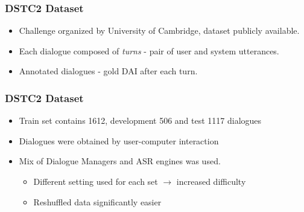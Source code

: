 \begin{frame}
\frametitle{DSTC2 Dataset\cite{Henderson2014a}}
\begin{itemize}
\item Challenge organized by University of Cambridge, dataset publicly available.
\item Each dialogue composed of \textit{turns} - pair of user and system utterances.
\item Annotated dialogues - gold DAI after each turn.
\end{itemize}

\end{frame}

\begin{frame}
\frametitle{DSTC2 Dataset}
\begin{itemize}
\item Train set contains 1612, development 506 and test 1117 dialogues
\item Dialogues were obtained by user-computer interaction
\item Mix of Dialogue Managers  and ASR engines was used.
\begin{itemize}
\item Different setting used for each set \alert{$\rightarrow$ increased difficulty}
\item Reshuffled data significantly easier
\end{itemize}
\end{itemize}
\end{frame}
